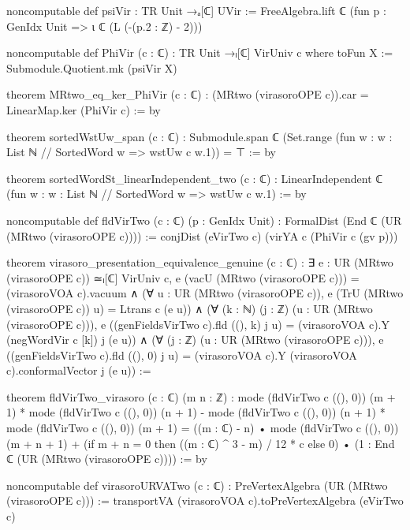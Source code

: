 \begin{leancode}
noncomputable def psiVir : TR Unit →ₐ[ℂ] UVir :=
  FreeAlgebra.lift ℂ (fun p : GenIdx Unit => ι ℂ (L (-(p.2 : ℤ) - 2)))

noncomputable def PhiVir (c : ℂ) : TR Unit →ₗ[ℂ] VirUniv c where
  toFun X := Submodule.Quotient.mk (psiVir X)

theorem MRtwo_eq_ker_PhiVir (c : ℂ) :
    (MRtwo (virasoroOPE c)).car = LinearMap.ker (PhiVir c) := by

theorem sortedWstUw_span (c : ℂ) :
    Submodule.span ℂ (Set.range (fun w : {w : List ℕ // SortedWord w} => wstUw c w.1)) = ⊤ := by

theorem sortedWordSt_linearIndependent_two (c : ℂ) :
    LinearIndependent ℂ (fun w : {w : List ℕ // SortedWord w} => wstUw c w.1) := by

noncomputable def fldVirTwo (c : ℂ) (p : GenIdx Unit) :
    FormalDist (End ℂ (UR (MRtwo (virasoroOPE c)))) :=
  conjDist (eVirTwo c) (virYA c (PhiVir c (gv p)))

theorem virasoro_presentation_equivalence_genuine (c : ℂ) :
    ∃ e : UR (MRtwo (virasoroOPE c)) ≃ₗ[ℂ] VirUniv c,
      e (vacU (MRtwo (virasoroOPE c))) = (virasoroVOA c).vacuum
      ∧ (∀ u : UR (MRtwo (virasoroOPE c)),
            e (TrU (MRtwo (virasoroOPE c)) u) = Ltrans c (e u))
      ∧ (∀ (k : ℕ) (j : ℤ) (u : UR (MRtwo (virasoroOPE c))),
            e ((genFieldsVirTwo c).fld ((), k) j u)
              = (virasoroVOA c).Y (negWordVir c [k]) j (e u))
      ∧ (∀ (j : ℤ) (u : UR (MRtwo (virasoroOPE c))),
            e ((genFieldsVirTwo c).fld ((), 0) j u)
              = (virasoroVOA c).Y (virasoroVOA c).conformalVector j (e u)) :=

theorem fldVirTwo_virasoro (c : ℂ) (m n : ℤ) :
    mode (fldVirTwo c ((), 0)) (m + 1) * mode (fldVirTwo c ((), 0)) (n + 1)
        - mode (fldVirTwo c ((), 0)) (n + 1) * mode (fldVirTwo c ((), 0)) (m + 1)
      = ((m : ℂ) - n) • mode (fldVirTwo c ((), 0)) (m + n + 1)
        + (if m + n = 0 then ((m : ℂ) ^ 3 - m) / 12 * c else 0) •
            (1 : End ℂ (UR (MRtwo (virasoroOPE c)))) := by

noncomputable def virasoroURVATwo (c : ℂ) : PreVertexAlgebra (UR (MRtwo (virasoroOPE c))) :=
  transportVA (virasoroVOA c).toPreVertexAlgebra (eVirTwo c)
\end{leancode}


